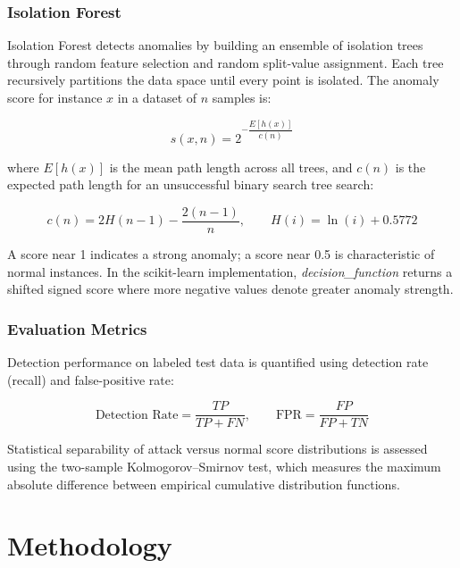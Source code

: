 \documentclass[12pt]{report}
\begin{document}
\subsection{Isolation Forest}

Isolation Forest detects anomalies by building an ensemble of isolation trees through random feature selection and random split-value assignment. Each tree recursively partitions the data space until every point is isolated. The anomaly score for instance $x$ in a dataset of $n$ samples is:

\begin{equation}
s(x, n) = 2^{-\dfrac{E[h(x)]}{c(n)}}
\end{equation}

\noindent where $E[h(x)]$ is the mean path length across all trees, and $c(n)$ is the expected path length for an unsuccessful binary search tree search:

\begin{equation}
c(n) = 2H(n-1) - \frac{2(n-1)}{n}, \qquad H(i) = \ln(i) + 0.5772
\end{equation}

A score near 1 indicates a strong anomaly; a score near 0.5 is characteristic of normal instances. In the scikit-learn implementation, \textit{decision\_function} returns a shifted signed score where more negative values denote greater anomaly strength.

\subsection{Evaluation Metrics}

Detection performance on labeled test data is quantified using detection rate (recall) and false-positive rate:

\begin{equation}
\text{Detection Rate} = \frac{TP}{TP + FN}, \qquad
\text{FPR} = \frac{FP}{FP + TN}
\end{equation}

Statistical separability of attack versus normal score distributions is assessed using the two-sample Kolmogorov--Smirnov test, which measures the maximum absolute difference between empirical cumulative distribution functions.

\chapter{Methodology}
\end{document}
